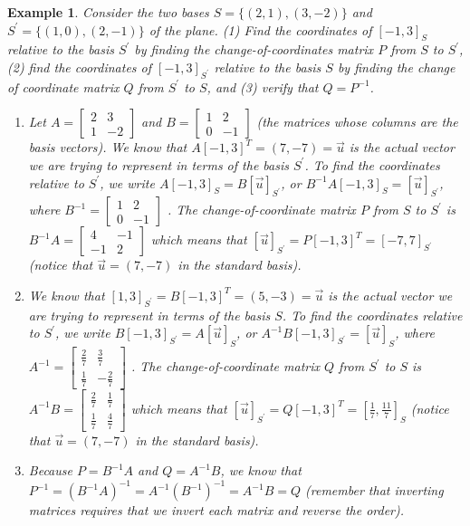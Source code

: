 \documentclass[10pt]{article}
\theoremstyle{plain}
\theoremstyle{box}
\newtheorem{example}{Example}
\begin{document}
\begin{example}
Consider the two bases $S=\{(2,1),(3,-2)\}$ and $S^\prime=\{(1,0),(2,-1)\}$ of the plane. (1) Find the coordinates of $[-1,3]_S$ relative to the basis $S^\prime$ by finding the change-of-coordinates matrix $P$ from $S$ to $S^\prime$, (2) find the coordinates of $[-1,3]_{S^\prime}$ relative to the basis $S$ by finding the change of coordinate matrix $Q$ from $S^\prime$ to $S$, and (3) verify that $Q=P^{-1}$.
\begin{enumerate}
	\item Let 
	$A=
\begin{bmatrix}
 2 & 3 \\
 1 & -2
\end{bmatrix}
$
and 
	$B=
\begin{bmatrix}
 1 & 2 \\
 0 & -1
\end{bmatrix}
$ (the matrices whose columns are the basis vectors).  We know that $A [-1,3]^T = (7,-7)=\vec u$ is the actual vector we are trying to represent in terms of the basis $S^\prime$.  To find the coordinates relative to $S^\prime$, we write $A [-1,3]_S = B[\vec u]_{S^\prime}$, or $B^{-1}A  [-1,3]_S= [\vec u]_{S^\prime}$, where 
$B^{-1} = 
\begin{bmatrix}
 1 & 2 \\
 0 & -1
\end{bmatrix}
$
. The change-of-coordinate matrix $P$ from $S$ to $S^\prime$ is 
$B^{-1}A =  
\begin{bmatrix}
 4 & -1 \\
 -1 & 2
\end{bmatrix}
$ which means that $[\vec u]_{S^\prime}= P[-1,3]^T = [-7,7]_{S^\prime}$ (notice that $\vec u = (7,-7)$ in the standard basis).

\item
We know that $[1,3]_{S^\prime}=B [-1,3]^T = (5,-3)=\vec u$ is the actual vector we are trying to represent in terms of the basis $S$. To find the coordinates relative to $S^\prime$, we write $B [-1,3]_{S^\prime} = A[\vec u]_{S}$, or $A^{-1}B  [-1,3]_{S^\prime}= [\vec u]_{S}$, where 
$A^{-1} = 
\begin{bmatrix}
 \frac{2}{7} & \frac{3}{7} \\
 \frac{1}{7} & -\frac{2}{7}
\end{bmatrix}
$
. The change-of-coordinate matrix $Q$ from $S^\prime$ to $S$  is 
$A^{-1}B =  
\begin{bmatrix}
 \frac{2}{7} & \frac{1}{7} \\
 \frac{1}{7} & \frac{4}{7}
\end{bmatrix}
$ which means that $[\vec u]_{S^\prime}= Q[-1,3]^T = [\frac{1}{7},\frac{11}{7}]_{S}$ (notice that $\vec u = (7,-7)$ in the standard basis).
\item Because $P=B^{-1}A$ and $Q=A^{-1}B$, we know that $P^{-1} = (B^{-1}A)^{-1} = A^{-1}(B^{-1})^{-1} = A^{-1}B=Q$ (remember that inverting matrices requires that we invert each matrix and reverse the order).

\end{enumerate}
\end{example}
\end{document}
